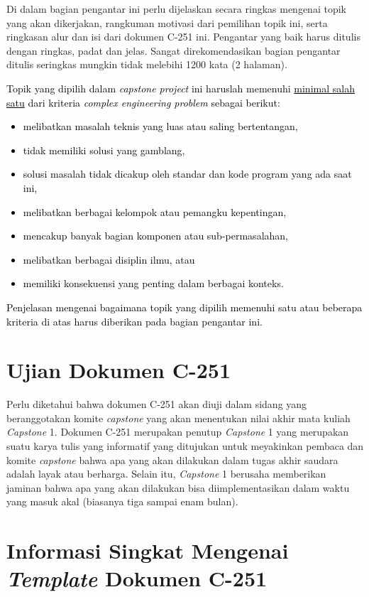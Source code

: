 
Di dalam bagian pengantar ini perlu dijelaskan secara ringkas mengenai topik yang akan dikerjakan, rangkuman motivasi dari pemilihan topik ini, serta ringkasan alur dan isi dari dokumen C-251 ini. Pengantar yang baik harus ditulis dengan ringkas, padat dan jelas. Sangat direkomendasikan bagian pengantar ditulis seringkas mungkin tidak melebihi 1200 kata (2 halaman).

\textcolor{black}{Topik yang dipilih dalam \textit{capstone project} ini haruslah memenuhi \underline{minimal salah satu} dari kriteria \textit{complex engineering problem} sebagai berikut:
\begin{itemize}
    \item melibatkan masalah teknis yang luas atau saling bertentangan,
    \item tidak memiliki solusi yang gamblang,
    \item solusi masalah tidak dicakup oleh standar dan kode program yang ada saat ini,
    \item melibatkan berbagai kelompok atau pemangku kepentingan,
    \item mencakup banyak bagian komponen atau sub-permasalahan,
    \item melibatkan berbagai disiplin ilmu, atau
    \item memiliki konsekuensi yang penting dalam berbagai konteks.
\end{itemize}
Penjelasan mengenai bagaimana topik yang dipilih memenuhi satu atau beberapa kriteria di atas harus diberikan pada bagian pengantar ini.
}

\section{Ujian Dokumen C-251}
\label{sec:Ujian_Dokumen_C-251}
    
    Perlu diketahui bahwa dokumen C-251 akan diuji dalam sidang yang beranggotakan komite \textit{capstone} yang akan menentukan nilai akhir mata kuliah \textit{Capstone} 1. Dokumen C-251 merupakan penutup \textit{Capstone} 1 yang merupakan suatu karya tulis yang informatif yang ditujukan untuk meyakinkan pembaca dan komite \textit{capstone} bahwa apa yang akan dilakukan dalam tugas akhir saudara adalah layak atau berharga. Selain itu, \textit{Capstone} 1 berusaha memberikan jaminan bahwa apa yang akan dilakukan bisa diimplementasikan dalam waktu yang masuk akal (biasanya tiga sampai enam bulan).

\section{Informasi Singkat Mengenai \textit{Template} Dokumen C-251}
\label{sec:Informasi_Singkat_Mengenai_Template_Dokumen_C-251}

